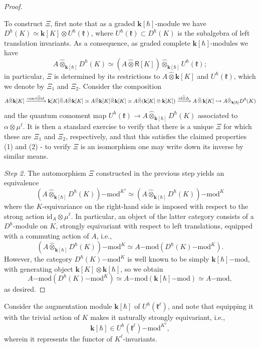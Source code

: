\documentclass{amsart}
\theoremstyle{definition}
\newcommand{\fk}{\mathfrak{k}}
\newcommand{\lmod}{\on{-mod}}
\newcommand{\on}{\mathrm}
\newcommand{\Ring}{\mathsf{R}}
\newcommand{\bk}{\mathbf{k}}
\newcommand{\wotimes}{\widehat{\otimes}_{\bk[\hbar]}}
\newcommand{\cotimes}{\hspace{.5mm}\widetilde{\otimes}\hspace{.5mm}}
\numberwithin{equation}{section}
\begin{document}
{\begin{proof}
\begin{enumerate}
\end{enumerate}
To construct $\Xi$, first note that as a graded $\bk[\hbar]$-module we have $D^\hbar(K) \simeq \bk[K] \otimes U^\hbar(\fk)$, where $U^\hbar(\fk) \subset D^\hbar(K)$ is the subalgebra of left translation invariants. As a consequence, as graded complete $\bk[\hbar]$-modules we have 
$$A \wotimes D^\hbar(K) \simeq (A \widehat{\otimes} \Ring[K]) \wotimes U^\hbar(\fk);$$
in particular, $\Xi$ is determined by its restrictions to $A \widehat{\otimes} \bk[K]$ and $U^\hbar(\fk)$, which we denote by $\Xi_1$ and $\Xi_2$. Consider the composition 
$$A \widehat{\otimes} \bk[K] \xrightarrow{\on{coact} \widehat{\otimes} \on{id}} \bk[K] \widehat{\otimes} A \widehat{\otimes} \bk[K]  \simeq A \widehat{\otimes} \bk[K] \widehat{\otimes} \bk[K] \simeq A \widehat{\otimes} (\bk[K] \otimes \bk[K]) \xrightarrow{ \on{id} \widehat{\otimes} \Delta} A \cotimes \bk[K] \hookrightarrow A \wotimes D^\hbar(K)$$
and the quantum comoment map $U^\hbar(\fk) \rightarrow A \wotimes D^\hbar(K)$ associated to  $\alpha \otimes \mu^\ell$. It is then a standard exercise to verify that there is a unique $\Xi$ for which these are $\Xi_1$ and $\Xi_2$, respectively, and that this satisfies the claimed properties (1) and (2) - to verify $\Xi$ is an isomorphism one may write down its inverse by similar means. 



{\em Step 2.} The automorphism $\Xi$ constructed in the previous step yields an equivalence 
$$(A \wotimes D^\hbar(K))\lmod^{K^\ell} \simeq (A \wotimes D^\hbar(K))\lmod^{K} $$
where the $K$-equivariance on the right-hand side is imposed with respect to the strong action $\on{id}_A \otimes \mu^\ell$. In particular, an object of the latter category consists of a $D^\hbar$-module on $K$, strongly equivariant with respect to left translations, equipped with a commuting action of $A$, i.e., 
$$(A \wotimes D^\hbar(K))\lmod^K \simeq A\lmod(D^\hbar(K)\lmod^K).$$
However, the category $D^\hbar(K)\lmod^K$ is well known to be simply $\bk[\hbar]\lmod$, with generating object $\bk[K] \otimes \bk[\hbar]$, so we obtain 
$$A\lmod(D^\hbar(K)\lmod^K) \simeq A\lmod(\bk[\hbar]\lmod) \simeq A\lmod,$$
as desired. 
\end{proof}
}




\iffalse Consider the augmentation module $\bk[\hbar]$ of $U^\hbar(\fk^\ell)$, and note that equipping it with the trivial action of $K$ makes it naturally strongly equivariant, i.e., $$\bk[\hbar] \in U^\hbar(\fk^\ell)\lmod^{K^\ell},$$wherein it represents the functor of $K^\ell$-invariants.  
\end{document}
